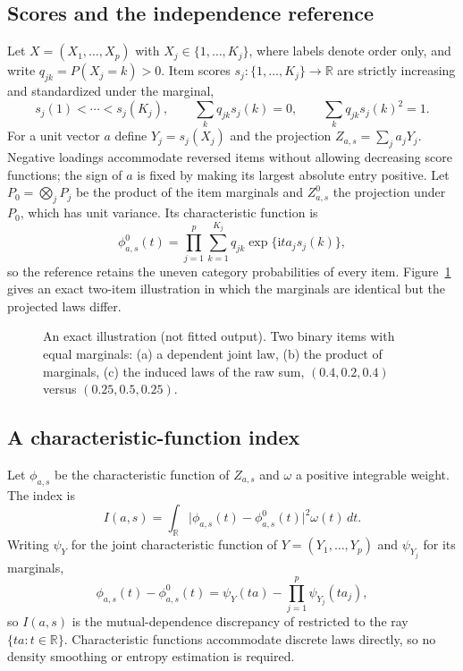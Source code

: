 \subsection{Scores and the independence reference}
Let $X=(X_1,\ldots,X_p)$ with $X_j\in\{1,\ldots,K_j\}$, where labels denote order only, and write $q_{jk}=P(X_j=k)>0$. Item scores $s_j:\{1,\ldots,K_j\}\to\mathbb{R}$ are strictly increasing and standardized under the marginal,
\begin{equation}\label{eq:scores}
 s_j(1)<\cdots<s_j(K_j),\qquad \textstyle\sum_k q_{jk}s_j(k)=0,\qquad \sum_k q_{jk}s_j(k)^2=1 .
\end{equation}
For a unit vector $a$ define $Y_j=s_j(X_j)$ and the projection $Z_{a,s}=\sum_j a_jY_j$. Negative loadings accommodate reversed items without allowing decreasing score functions; the sign of $a$ is fixed by making its largest absolute entry positive. Let $P_0=\bigotimes_jP_j$ be the product of the item marginals and $Z^0_{a,s}$ the projection under $P_0$, which has unit variance. Its characteristic function is
\begin{equation}\label{eq:ref}
 \phi^0_{a,s}(t)=\prod_{j=1}^p\sum_{k=1}^{K_j}q_{jk}\exp\{\mathrm{i}ta_js_j(k)\},
\end{equation}
so the reference retains the uneven category probabilities of every item. Figure~\ref{fig:reference} gives an exact two-item illustration in which the marginals are identical but the projected laws differ.

\begin{figure}[htbp]
\centering
{}
\caption{An exact illustration (not fitted output). Two binary items with equal marginals: (a) a dependent joint law, (b) the product of marginals, (c) the induced laws of the raw sum, $(0.4,0.2,0.4)$ versus $(0.25,0.5,0.25)$.}
\label{fig:reference}
\end{figure}

\subsection{A characteristic-function index}
Let $\phi_{a,s}$ be the characteristic function of $Z_{a,s}$ and $\omega$ a positive integrable weight. The index is
\begin{equation}\label{eq:index}
 I(a,s)=\int_{\mathbb{R}}\bigl|\phi_{a,s}(t)-\phi^0_{a,s}(t)\bigr|^2\omega(t)\,dt .
\end{equation}
Writing $\psi_Y$ for the joint characteristic function of $Y=(Y_1,\ldots,Y_p)$ and $\psi_{Y_j}$ for its marginals,
\begin{equation}\label{eq:slice}
 \phi_{a,s}(t)-\phi^0_{a,s}(t)=\psi_Y(ta)-\prod_{j=1}^p\psi_{Y_j}(ta_j),
\end{equation}
so $I(a,s)$ is the mutual-dependence discrepancy of \citet{bakirov2006} restricted to the ray $\{ta:t\in\mathbb{R}\}$. Characteristic functions accommodate discrete laws directly, so no density smoothing or entropy estimation is required.

